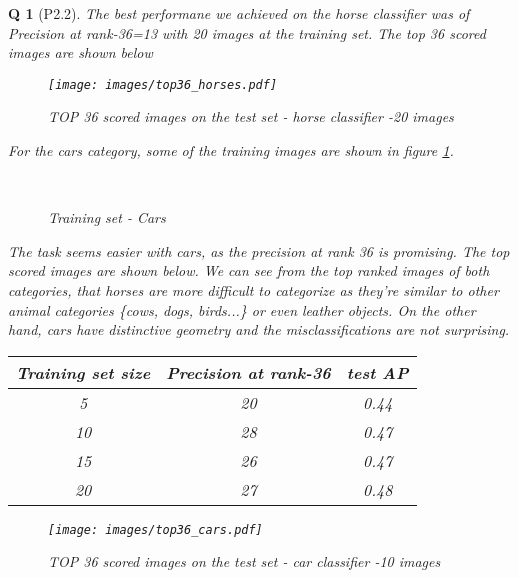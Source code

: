 \documentclass[11pt]{article}
\theoremstyle{exo}
\newtheorem*{exercise}{Q}
\newcommand{\1}{\mathbf{1}}
\newcommand{\0}{\mathbf{0}}
\begin{document}
\begin{exercise}[P2.2]
	The best performane we achieved on the \textit{horse} classifier was of Precision at rank-36=13 with 20 images at the training set. The top 36 scored images are shown below
	\begin{figure}[H]
		\caption{TOP 36 scored images on the test set - \textit{horse} classifier -20 images}
		\centering
		\texttt{[image: images/top36\_horses.pdf]}
	\end{figure}
	For the \textit{cars} category, some of the training images are shown in figure \ref{cars}.
	\begin{figure}[H]
		\caption{Training set - Cars \label{cars}}
		\centering
		\\
	\end{figure}
	The task seems easier with cars, as the precision at rank 36 is promising. The top scored images are shown below. We can see from the top ranked images of both categories, that \textit{horses} are more difficult to categorize as they're similar to  other animal categories \{cows, dogs, birds...\} or even leather objects. On the other hand, \textit{cars} have distinctive geometry and the misclassifications are not surprising.
	\begin{table}[H]
		\centering
		\begin{tabular}{||c|c|c||}
		\hline
		Training set size & Precision at rank-36 & test AP\\
		\hline
		5 & 20 & 0.44\\
		10 & {\color{Emerald}28} & 0.47 \\
		15 & 26 & 0.47\\
		20 & 27 & 0.48\\
		\hline
		\end{tabular}
	\end{table}
	\begin{figure}[H]
		\caption{TOP 36 scored images on the test set - \textit{car} classifier -10 images}
		\centering
		\texttt{[image: images/top36\_cars.pdf]}
	\end{figure}
\end{exercise}
\end{document}
